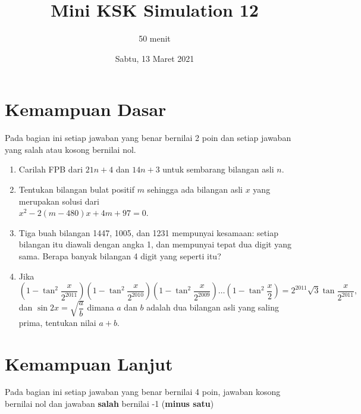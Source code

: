 \documentclass[12pt]{scrartcl}
\title{Mini KSK Simulation 12}
\author{50 menit}
\date{Sabtu, 13 Maret 2021}
\begin{document}
	\maketitle

\renewcommand*\contentsname{Daftar Isi}
\tableofcontents

\newpage
	
	\section{Kemampuan Dasar}
	Pada bagian ini setiap jawaban yang benar bernilai 2 poin dan setiap jawaban yang salah
	atau kosong bernilai nol.
	\begin{enumerate}
		\item 
		Carilah FPB dari $21n + 4$ dan $14n + 3$ untuk sembarang bilangan asli $n$.
	
		
		\item Tentukan bilangan bulat positif $m$ sehingga ada bilangan asli $x$ yang merupakan solusi dari\\ $x^2-2(m-480)x+4m+97=0$.
		
		\item Tiga buah bilangan 1447, 1005, dan 1231 mempunyai kesamaan: setiap bilangan itu diawali dengan angka 1, dan mempunyai tepat dua digit yang sama. Berapa banyak bilangan 4 digit yang seperti itu?
		
		\item Jika $$\left(1-\tan^2\frac{x}{2^{2011}}\right)\left(1-\tan^2\frac{x}{2^{2010}}\right)\left(1-\tan^2\frac{x}{2^{2009}}\right)\dots\left(1-\tan^2\frac{x}{2}\right) = 2^{2011}\sqrt{3}\tan \frac{x}{2^{2011}},$$ dan $\sin 2x = \sqrt{\dfrac{a}{b}}$ dimana $a$ dan $b$ adalah dua bilangan asli yang saling prima, tentukan nilai $a+b$.
	\end{enumerate}

\section{Kemampuan Lanjut}
Pada bagian ini setiap jawaban yang benar bernilai 4 poin, jawaban kosong bernilai nol
dan jawaban \textbf{salah} bernilai -1 (\textbf{minus satu})
\end{document}
